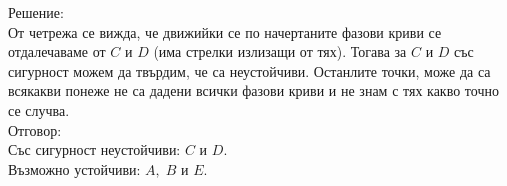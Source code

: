 \documentclass[a4paper, 12pt, oneside]{article}
\begin{document}
Решение: \\

От четрежа се вижда, че движийки се по начертаните фазови криви
се отдалечаваме от $C$ и $D$ (има стрелки излизащи от тях).
Тогава за $C$ и $D$ със сигурност можем да твърдим, че са неустойчиви.
Останлите точки, може да са всякакви понеже не са дадени всички фазови
криви и не знам с тях какво точно се случва. \\

Отговор: \\

Със сигурност неустойчиви: $C$ и $D$. \\

Възможно устойчиви: $A, \; B$ и $E$.
\end{document}
